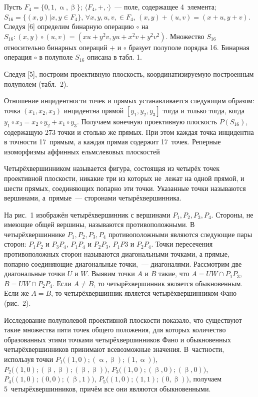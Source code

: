 Пусть $F_4 = \lbrace0,1,\upalpha,\upbeta\rbrace$; $\langle F_4,+,\cdot \rangle$~--- поле, содержащее 4~элемента;\\ $S_{16} = \lbrace (x,y)|x,y \in F_4 \rbrace$, $\forall x,y,u,v, \in F_4$, $(x,y)+(u,v)=(x+u,y+v)$. Следуя [6] определим бинарную операцию $\circ$ на $S_{16} : (x,y)\circ(u,v) = (xu+y^2v, yu+x^2v+y^2v^2)$. Множество $S_{16}$
относительно бинарных операций $+$ и $\circ$ бразует полуполе порядка 16. Бинарная операция $\circ$ в полуполе $S_{16}$ описана в табл. 1.



Следуя [5], построим проективную плоскость, координатизируемую построенным полуполем (табл.~2).



Отношение инцидентности точек и прямых устанавливается следующим образом: точка $(x_1,x_2,x_3)$ инцидентна прямой $[y_1,y_2,y_3]$ тогда и только тогда, когда $y_1 \circ x_3 = x_2 \circ y_2 + x_1 \circ y_3$. Получаем конечную проективную плоскость $P(S_{16})$, содержащую 273 точки и столько же прямых. При этом каждая точка инцидентна в точности 17~прямым, а каждая прямая содержит 17~точек.
Реперные изоморфизмы аффинных ельмслевовых плоскостей


Четырёхвершинником называется  фигура, состоящая из четырёх точек проективной плоскости, никакие три из которых не~лежат на одной прямой, и шести прямых, соединяющих попарно эти точки. Указанные точки называются вершинами, а~прямые~--- сторонами четырёхвершинника.

На рис.~1 изображён четырёхвершинник с вершинами $P_1, P_2, P_3, P_4$. Стороны, не имеющие общей вершины, называются противоположными. В четырёхвершиннике $P_1, P_2, P_3, P_4$ противоположными являются следующие пары сторон: $P_1P_2$ и $P_3P_4$, $P_1P_4$ и $P_2P_3$, $P_1P3$ и $P_2P_4$. Точки пересечения противоположных сторон называются диагональными точками, а прямые, попарно соединяющие диагональные точки,~--- диагоналями. Рассмотрим две диагональные точки $U$ и $W$. Выявим точки $A$ и $B$ такие, что $A = UW \cap P_1P_3$, $B = UW \cap P_2P_4$. Если $A \neq B$, то четырёхвершинник является обыкновенным. Если же $A = B$, то четырёхвершинник является четырёхвершинником Фано (рис.~2).

\vspace{-8pt}


\clearpage


Исследование полуполевой проективной плоскости  показало, что существуют такие множества пяти точек общего положения, для которых количество образованных этими точками четырёхвершинников Фано и обыкновенных четырёхвершинников принимают всевозможные значения. В~частности, используя точки $P_1 \bigl((1,0);(\upalpha,\upbeta);(1,\upalpha)\bigr)$, $P_2 \bigl((1,0);(\upbeta,\upbeta);(\upbeta,\upbeta)\bigr)$, $P_3 \bigl((1,0);(\upbeta,0);(\upbeta,0)\bigr)$, $P_4 \bigl((1,0);(0,0);(\upbeta,1)\bigr)$, $P_5 \bigl((1,0);(1,1);(0,\upbeta)\bigr)$,  получаем 5~четырёхвершинников, причём все они являются обыкновенными.

